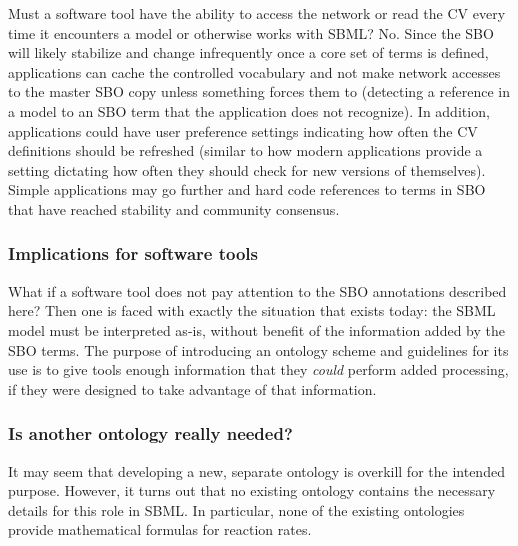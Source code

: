 Must a software tool have the ability to access the network or
read the CV every time it encounters a model or otherwise works
with SBML?  No.  Since the SBO will likely stabilize and change
infrequently once a core set of terms is defined, applications can
cache the controlled vocabulary and not make network accesses to
the master SBO copy unless something forces them to (\eg detecting
a reference in a model to an SBO term that the application does
not recognize).  In addition, applications could have user
preference settings indicating how often the CV definitions should
be refreshed (similar to how modern applications provide a setting
dictating how often they should check for new versions of
themselves).  Simple applications may go further and hard code
references to terms in SBO that have reached stability and
community consensus.


\subsubsection{Implications for software tools}

What if a software tool does not pay attention to the SBO
annotations described here?  Then one is faced with exactly the
situation that exists today: the SBML model must be interpreted
as-is, without benefit of the information added by the SBO terms.
The purpose of introducing an ontology scheme and guidelines for
its use is to give tools enough information that they \emph{could}
perform added processing, if they were designed to take advantage
of that information.


\subsubsection{Is another ontology really needed?}

It may seem that developing a new, separate ontology is overkill
for the intended purpose.  However, it turns out that no existing
ontology contains the necessary details for this role in SBML.  In
particular, none of the existing ontologies provide mathematical
formulas for reaction rates.
